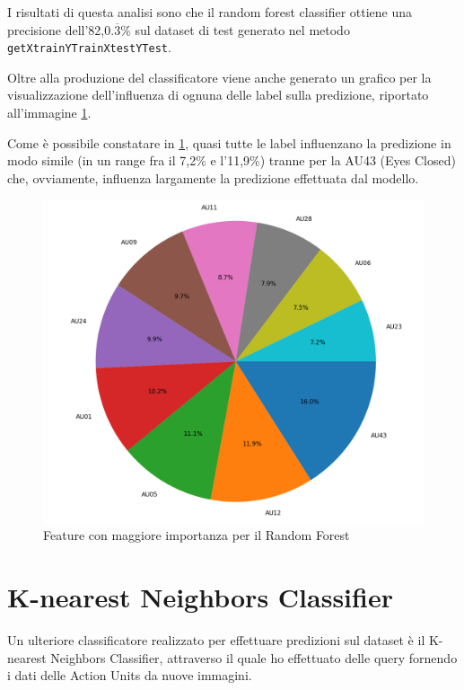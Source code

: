 I risultati di questa analisi sono che il random forest classifier ottiene una precisione dell’82,$0.\overline{3}$\% sul dataset di test generato nel metodo \texttt{getXtrainYTrainXtestYTest}.

Oltre alla produzione del classificatore viene anche generato un grafico per la visualizzazione dell’influenza di ognuna delle label sulla predizione, riportato all'immagine \ref{fig:image14}.

Come è possibile constatare in \ref{fig:image14}, quasi tutte le label influenzano la predizione in modo simile (in un range fra il 7,2\% e l’11,9\%) tranne per la AU43 (Eyes Closed) che, ovviamente, influenza largamente la predizione effettuata dal modello.
\newpage

\begin{figure}
    \begin{center}    
        \includegraphics[width=1\linewidth]{images/image37.png}
        \caption{Feature con maggiore importanza per il Random Forest}
        \label{fig:image14}
    \end{center}
\end{figure}

\section{K-nearest Neighbors Classifier}
Un ulteriore classificatore realizzato per effettuare predizioni sul dataset è il K-nearest Neighbors Classifier, attraverso il quale ho effettuato delle query fornendo i dati delle Action Units da nuove immagini.

